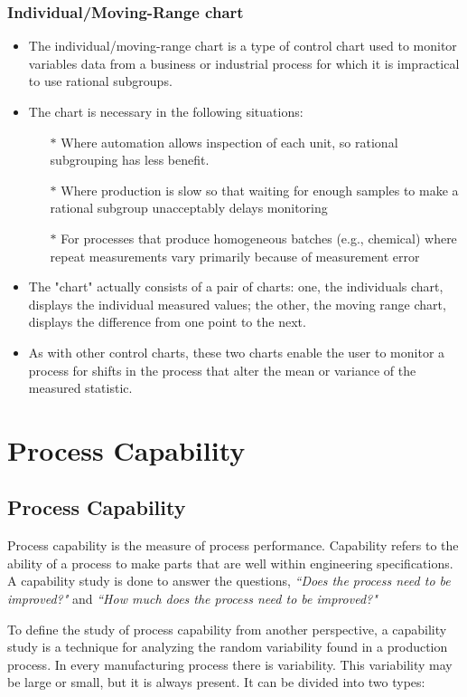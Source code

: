 \documentclass[MASTER-SPC.tex]{subfiles}
\begin{document}
\subsection{Individual/Moving-Range chart}
\begin{itemize}
\item The individual/moving-range chart is a type of control chart used to monitor variables data from a business or industrial process for which it is impractical to use rational subgroups.

\item The chart is necessary in the following situations:
\begin{itemize}
\item[$\ast$] Where automation allows inspection of each unit, so rational subgrouping has less benefit.
\item[$\ast$]Where production is slow so that waiting for enough samples to make a rational subgroup unacceptably delays monitoring
\item[$\ast$] For processes that produce homogeneous batches (e.g., chemical) where repeat measurements vary primarily because of measurement error
\end{itemize}
\item The "chart" actually consists of a pair of charts: one, the individuals chart, displays the individual measured values; the other, the moving range chart, displays the difference from one point to the next. 
\item As with other control charts, these two charts enable the user to monitor a process for shifts in the process that alter the mean or variance of the measured statistic.
\end{itemize}
\newpage
\chapter{Process Capability}
\section{Process Capability}
Process capability is the measure of process performance. Capability refers to the ability of a process to make parts that are well within engineering specifications. A capability study is done to answer the questions, \textit{``Does the process need to be improved?"} and  \textit{``How much does the process need to be improved?"}

To define the study of process capability from another perspective, a capability study is a technique for analyzing the random variability found in a production process. In every manufacturing process there is variability. This variability may be large or small, but it is always present. It can be divided into two types:
\end{document}
